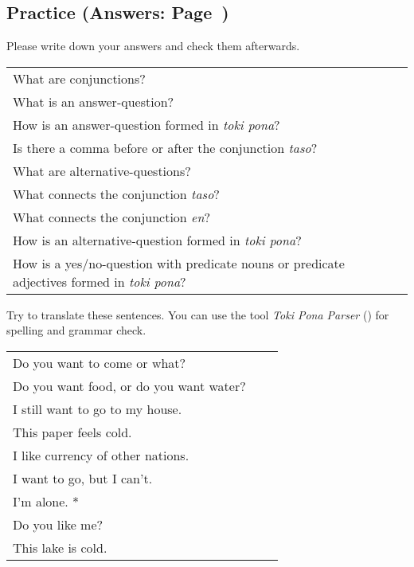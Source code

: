 {\subsection*{Practice (Answers: Page~\pageref{'conjunctions_temperature'})}
%
Please write down your answers and check them afterwards. 

\begin{supertabular}{p{5,5cm}|ll}
What are conjunctions? &&  \\ %
What is an answer-question? &&  \\ %
How is an answer-question formed in \textit{toki pona}? &&  \\ %
Is there a comma before or after the conjunction \textit{taso}? &&  \\ %
What are alternative-questions? &&   \\ %
What connects the conjunction \textit{taso}? &&   \\ %
What connects the conjunction \textit{en}? &&  \\ %
How is an alternative-question formed in \textit{toki pona}? &&  \\ %
How is a yes/no-question with predicate nouns or predicate adjectives formed in \textit{toki pona}? &&  \\ %
\end{supertabular}

Try to translate these sentences. 
You can use the tool \textit{Toki Pona Parser} (\cite{www:rowa:02}) for spelling and grammar check. 


\begin{supertabular}{p{5,5cm}|ll}
Do you want to come or what?    \\ %
Do you want food, or do you want water?    \\ %
I still want to go to my house.    \\ %
This paper feels cold.    \\ %
I like currency of other nations.   \\  %
I want to go, but I can't.    \\ %
I'm alone. *  \\ %
Do you like me?   &&   \\ %
This lake is cold. &&  \\ %
\end{supertabular}

}
